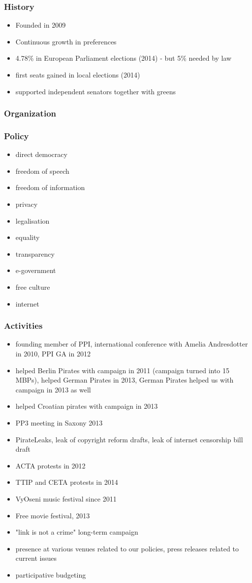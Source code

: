 \begin{frame}
	\frametitle{History}
	\begin{itemize}
		\item Founded in 2009
		\item Continuous growth in preferences 
		\item 4.78\% in European Parliament elections (2014) - but 5\% needed by law
		\item first seats gained in local elections (2014)
		\item supported independent senators together with greens
	\end{itemize}
\end{frame}
\begin{frame}
	\frametitle{Organization}
\end{frame}
\begin{frame}
	\frametitle{Policy}
	\begin{itemize}
		\item direct democracy
		\item freedom of speech
		\item freedom of information
		\item privacy
		\item legalisation
		\item equality
		\item transparency
		\item e-government
		\item free culture
		\item internet
	\end{itemize}
\end{frame}
\begin{frame}
	\frametitle{Activities}
	\begin{itemize}
		\item founding member of PPI, international conference with Amelia Andresdotter in 2010, PPI GA in 2012
		\item helped Berlin Pirates with campaign in 2011 (campaign turned into 15 MBPs), helped German Pirates in 2013, German Pirates helped us with campaign in 2013 as well
		\item helped Croatian pirates with campaign in 2013
		\item PP3 meeting in Saxony 2013
		\item PirateLeaks, leak of copyright reform drafts, leak of internet censorship bill draft
		\item ACTA protests in 2012
		\item TTIP and CETA protests in 2014
		\item VyOseni music festival since 2011
		\item Free movie festival, 2013
		\item "link is not a crime" long-term campaign
		\item presence at various venues related to our policies, press releases related to current issues
		\item participative budgeting
	\end{itemize}
\end{frame}
